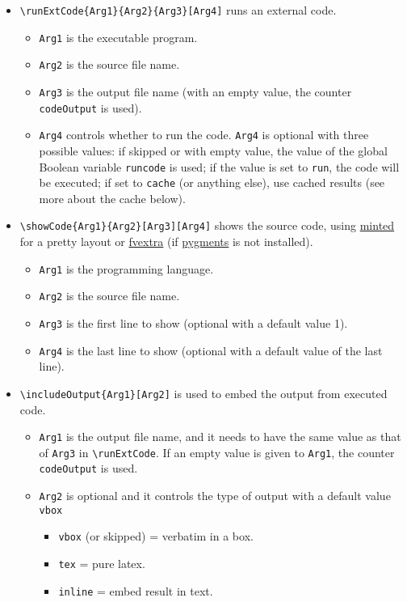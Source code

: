 \documentclass{ltxdoc}
\begin{document}
\begin{itemize}
\item \texttt{\textbackslash{}runExtCode\{Arg1\}\{Arg2\}\{Arg3\}[Arg4]} runs an external code.

\begin{itemize}
\item \texttt{Arg1} is the executable program.
\item \texttt{Arg2} is the source file name.
\item \texttt{Arg3} is the output file name (with an empty value, the counter
\texttt{codeOutput} is used).
\item \texttt{Arg4} controls whether to run the code. \texttt{Arg4} is optional with
three possible values: if skipped or with empty value, the value of
the global Boolean variable \texttt{runcode} is used; if the value is set
to \texttt{run}, the code will be executed; if set to \texttt{cache} (or anything
else), use cached results (see more about the cache below).
\end{itemize}

\item \texttt{\textbackslash{}showCode\{Arg1\}\{Arg2\}[Arg3][Arg4]} shows the source code, using
\href{https://ctan.org/pkg/minted}{minted} for a pretty layout or
\href{https://ctan.org/pkg/fvextra}{fvextra} (if
\href{https://pygments.org/}{pygments} is not installed).

\begin{itemize}
\item \texttt{Arg1} is the programming language.
\item \texttt{Arg2} is the source file name.
\item \texttt{Arg3} is the first line to show (optional with a default value 1).
\item \texttt{Arg4} is the last line to show (optional with a default value of
the last line).
\end{itemize}

\item \texttt{\textbackslash{}includeOutput\{Arg1\}[Arg2]} is used to embed the output from executed
code.

\begin{itemize}
\item \texttt{Arg1} is the output file name, and it needs to have the same value
as that of \texttt{Arg3} in \texttt{\textbackslash{}runExtCode}. If an empty value is given to
\texttt{Arg1}, the counter \texttt{codeOutput} is used.
\item \texttt{Arg2} is optional and it controls the type of output with a default
value \texttt{vbox}
\begin{itemize}
\item \texttt{vbox} (or skipped) = verbatim in a box.
\item \texttt{tex} = pure latex.
\item \texttt{inline} = embed result in text.
\end{itemize}
\end{itemize}


\end{itemize}
\end{document}
